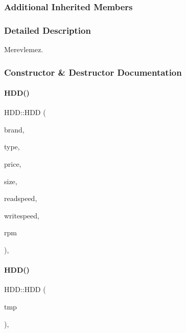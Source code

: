 \subsubsection*{Additional Inherited Members}


\subsubsection{Detailed Description}
Merevlemez. 

\subsubsection{Constructor \& Destructor Documentation}
\mbox{\label{class_h_d_d_a375ad923cb64a11afc261fe1fac5276c}} 
\paragraph{\texorpdfstring{HDD()}{HDD()}\hspace{0.1cm}{\footnotesize\ttfamily [1/2]}}
{\footnotesize\ttfamily H\+D\+D\+::\+H\+DD (\begin{DoxyParamCaption}\item[{\mbox{\hyperlink{class_string}{String}}}]{brand,  }\item[{\mbox{\hyperlink{class_string}{String}}}]{type,  }\item[{int}]{price,  }\item[{int}]{size,  }\item[{int}]{readspeed,  }\item[{int}]{writespeed,  }\item[{int}]{rpm }\end{DoxyParamCaption})\hspace{0.3cm}{\ttfamily [inline]}, {\ttfamily [explicit]}}

\mbox{\label{class_h_d_d_a74adfdcd9b7e7e1e463f6e5c442c78e0}} 
\paragraph{\texorpdfstring{HDD()}{HDD()}\hspace{0.1cm}{\footnotesize\ttfamily [2/2]}}
{\footnotesize\ttfamily H\+D\+D\+::\+H\+DD (\begin{DoxyParamCaption}\item[{\mbox{\hyperlink{struct_temp_input}{Temp\+Input}} \&}]{tmp }\end{DoxyParamCaption})\hspace{0.3cm}{\ttfamily [inline]}, {\ttfamily [explicit]}}



